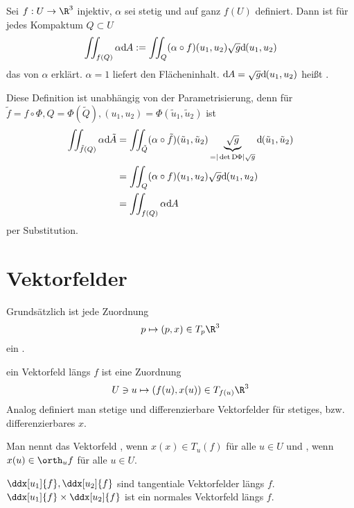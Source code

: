 \begin{df}[Oberflächenintegral]
	Sei $f: U \to \R^3$ injektiv, $\alpha$ sei stetig und auf ganz $f(U)$ definiert.
	Dann ist für jedes Kompaktum $Q \subset U$
	\[
		\iint_{f(Q)} \alpha \dx[A]
		:= \iint_{Q} (\alpha \circ f)(u_1, u_2) \sqrt{g} \dx[(u_1, u_2)]
	\]
	das  von $\alpha$ erklärt.
	$\alpha = 1$ liefert den Flächeninhalt.
	$\dx[A] = \sqrt{g} \dx[(u_1, u_2)]$ heißt .
	\begin{note}
		Diese Definition ist unabhängig von der Parametrisierung, denn für $\tilde f = f \circ \Phi, Q = \Phi(\tilde Q), (u_1,u_2) = \Phi(\tilde u_1, \tilde u_2)$ ist
		\begin{align*}
			\iint_{\tilde f(Q)} \alpha \dx[\tilde A]
			&= \iint_{\tilde Q} (\alpha \circ \tilde f)(\tilde u_1, \tilde u_2) \underbrace{\sqrt{g}}_{=|\det \Df[\Phi]| \sqrt{g}} \dx[(\tilde u_1, \tilde u_2)] \\
			&= \iint_{Q} (\alpha \circ f) (u_1, u_2) \sqrt{g} \dx[(u_1, u_2)] \\
			&= \iint_{f(Q)} \alpha \dx[A]
		\end{align*}
		per Substitution.
	\end{note}
\end{df}

\section{Vektorfelder}


Grundsätzlich ist jede Zuordnung
\[
	p \mapsto (p, x) \in T_p\R^3
\]
ein .

\begin{df}
	ein Vektorfeld längs $f$ ist eine Zuordnung
	\[
		U \ni u \mapsto (f(u), x(u)) \in T_{f(u)} \R^3
	\]
	Analog definiert man stetige und differenzierbare Vektorfelder für stetiges, bzw. differenzierbares $x$.

	Man nennt das Vektorfeld , wenn $x(x) \in T_u(f)$ für alle $u \in U$ und , wenn $x(u) \in \orth_u f$ für alle $u \in U$.
\end{df}

\begin{ex}
	$\ddx[u_1]{f}, \ddx[u_2]{f}$ sind tangentiale Vektorfelder längs $f$.
	$\ddx[u_1]{f} \times \ddx[u_2]{f}$ ist ein normales Vektorfeld längs $f$.
\end{ex}

